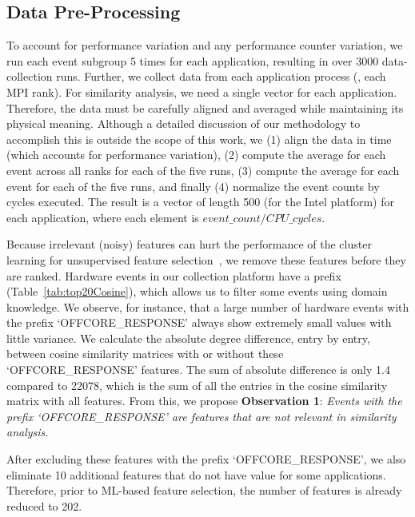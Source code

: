 \subsection{Data Pre-Processing}
\label{sec:prep}
To account for performance variation and any performance counter variation, we run each event subgroup 5 times for each application, resulting in over 3000 data-collection runs.  Further, we collect data from each application process (\ie, each MPI rank).  For similarity analysis, we need a single vector for each application.  Therefore, the data must be carefully aligned and averaged while maintaining its physical meaning.  Although a detailed discussion of our methodology to accomplish this is outside the scope of this work, we (1) align the data in time (which accounts for performance variation), (2) compute the average for each event across all ranks for each of the five runs, (3) compute the average for each event for each of the five runs, and finally (4) normalize the event counts by cycles executed. The result is a vector of length 500 (for the Intel platform) for each application, where each element is 
$event\_count/CPU\_cycles$.  

Because irrelevant (noisy) features can hurt the performance of the cluster learning for unsupervised feature selection~\cite{lindenbaum2021differentiable}, we  remove these features before they are ranked. %
Hardware events in our collection platform have a prefix (Table~\ref{tab:top20Cosine}), which allows us to filter some events using domain knowledge.
We observe, for instance, that a large number of hardware events with the prefix `OFFCORE\_RESPONSE' always show extremely small values with little variance. We calculate the absolute degree difference, entry by entry, between cosine similarity matrices with or without these `OFFCORE\_RESPONSE' features. The sum of absolute difference is only 1.4 compared to 22078, which is the sum of all the entries in the cosine similarity matrix with all features.  From this, we propose \textbf{Observation 1}: 
\textit{Events with the prefix `OFFCORE\_RESPONSE' are features that are not relevant in similarity analysis.} 

After excluding these features with the prefix `OFFCORE\_RESPONSE', we also eliminate 10 additional features that do not have value for some applications. Therefore, prior to ML-based feature selection, the number of features is already reduced to 202.

